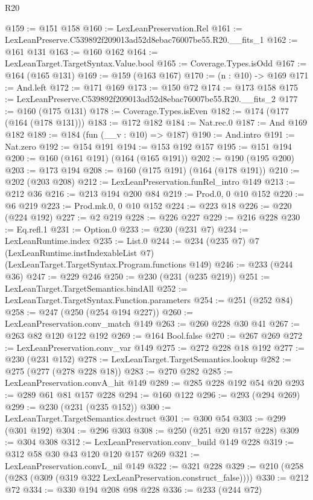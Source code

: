 \begin{lexlean}{R20}
\begin{coremodule}
@159 := @151 @158
@160 := LexLeanPreservation.Rel
@161 := LexLeanPreserve.C539892f209013ad52d8ebac76007be55.R20.__fits_1
@162 := @161 @131
@163 := @160 @162
@164 := LexLeanTarget.TargetSyntax.Value.bool
@165 := Coverage.Types.isOdd
@167 := @164 (@165 @131)
@169 := @159 (@163 @167)
@170 := (n : @10) -> @169
@171 := And.left
@172 := @171 @169
@173 := @150 @72
@174 := @173 @158
@175 := LexLeanPreserve.C539892f209013ad52d8ebac76007be55.R20.__fits_2
@177 := @160 (@175 @131)
@178 := Coverage.Types.isEven
@182 := @174 (@177 (@164 (@178 @131)))
@183 := @172 @182
@184 := Nat.rec.{0}
@187 := And @169 @182
@189 := @184 (fun (__v : @10) => @187)
@190 := And.intro
@191 := Nat.zero
@192 := @154 @191
@194 := @153 @192 @157
@195 := @151 @194
@200 := @160 (@161 @191) (@164 (@165 @191))
@202 := @190 (@195 @200)
@203 := @173 @194
@208 := @160 (@175 @191) (@164 (@178 @191))
@210 := @202 (@203 @208)
@212 := LexLeanPreservation.funRel_intro @149
@213 := @212 @36
@216 := @213 @194 @200 @84
@219 := Prod.{0, 0} @10 @152
@220 := @6 @219
@223 := Prod.mk.{0, 0} @10 @152
@224 := @223 @18
@226 := @220 (@224 @192)
@227 := @2 @219
@228 := @226 @227
@229 := @216 @228
@230 := Eq.refl.{1}
@231 := Option.{0}
@233 := @230 (@231 @7)
@234 := LexLeanRuntime.index
@235 := List.{0}
@244 := @234
    (@235 @7)
    @7
    (LexLeanRuntime.instIndexableList @7)
    (LexLeanTarget.TargetSyntax.Program.functions @149)
@246 := @233 (@244 @36)
@247 := @229 @246
@250 := @230 (@231 (@235 @219))
@251 := LexLeanTarget.TargetSemantics.bindAll
@252 := LexLeanTarget.TargetSyntax.Function.parameters
@254 := @251 (@252 @84)
@258 := @247 (@250 (@254 @194 @227))
@260 := LexLeanPreservation.conv_match @149
@263 := @260 @228 @30 @41
@267 := @263 @82 @120 @122 @192
@269 := @164 Bool.false
@270 := @267 @269
@272 := LexLeanPreservation.conv_var @149
@275 := @272 @228 @18 @192
@277 := @230 (@231 @152)
@278 := LexLeanTarget.TargetSemantics.lookup
@282 := @275 (@277 (@278 @228 @18))
@283 := @270 @282
@285 := LexLeanPreservation.convA_hit @149
@289 := @285 @228 @192 @54 @20
@293 := @289 @61 @81 @157 @228
@294 := @160 @122
@296 := @293 (@294 @269)
@299 := @230 (@231 (@235 @152))
@300 := LexLeanTarget.TargetSemantics.destruct
@301 := @300 @54
@303 := @299 (@301 @192)
@304 := @296 @303
@308 := @250 (@251 @20 @157 @228)
@309 := @304 @308
@312 := LexLeanPreservation.conv_build @149 @228
@319 := @312 @58 @30 @43 @120 @120 @157 @269
@321 := LexLeanPreservation.convL_nil @149
@322 := @321 @228
@329 := @210 (@258 (@283 (@309 (@319 @322 LexLeanPreservation.construct_false))))
@330 := @212 @72
@334 := @330 @194 @208 @98 @228
@336 := @233 (@244 @72)

\end{coremodule}
\end{lexlean}
